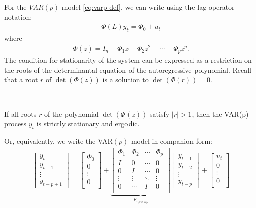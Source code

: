 For the $VAR(p)$ model \ref{eq:varp-def}, we can write using the lag operator notation:
\begin{gather*}
    \Phi (L) y_t = \Phi_0 + u_t
\end{gather*}
where
\begin{gather*}
    \Phi(z) = I_n - \Phi_1 z - \Phi_2 z^2 - \cdots - \Phi_p z^p.
\end{gather*}
The condition for stationarity of the system can be expressed as a restriction on the roots of the
determinantal equation of the autoregressive polynomial.
Recall that a root $r$ of $\det \left(\Phi(z) \right)$ is a solution to $\det \left(\Phi(r) \right) = 0$.
\begin{theorem}\label{thm:stationarity-varp}
    \

    If all roots $r$ of the polynomial $\det \left(\Phi(z) \right)$ satisfy $\vert r \vert > 1$,
    then the VAR(p) process $y_t$ is strictly stationary and ergodic.
\end{theorem}
Or, equivalently, we write the VAR$(p)$ model in companion form:
\begin{gather*}
    \begin{bmatrix}
        y_t \\
        y_{t-1} \\
        \vdots \\
        y_{t-p+1}
    \end{bmatrix} = \begin{bmatrix}
         \Phi_0 \\
         0 \\
         \vdots \\
         0 \\
    \end{bmatrix} + 
    \underset{F_{np \times np}}{\underbrace{\begin{bmatrix}
        \Phi_1 & \Phi_2 & \cdots & \Phi_p \\
        I & 0 & \cdots & 0 \\
        0 & I & \cdots & 0 \\
        \vdots & \vdots & \ddots & \vdots \\
        0 & \cdots & I & 0 \\
    \end{bmatrix}}}
    \begin{bmatrix}
        y_{t-1} \\
        y_{t-2} \\
        \vdots \\
        y_{t-p}
    \end{bmatrix} + 
    \begin{bmatrix}
         u_t \\
         0 \\
         \vdots \\
         0 \\
    \end{bmatrix}
\end{gather*}
